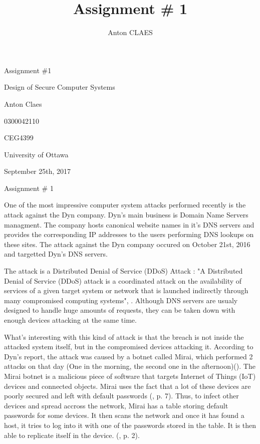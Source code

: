 \documentclass[a4paper,man,natbib,12]{apa6}
\title{Assignment \# 1}
\author{Anton CLAES}
\affiliation{University of Ottawa}
\begin{document}
\thispagestyle{empty}

\begin{center}
\vspace*{5\baselineskip}
Assignment \#1

Design of Secure Computer Systems

\vspace*{10\baselineskip}

Anton Claes

0300042110

CEG4399

University of Ottawa

September 25th, 2017

\newpage

Assignment \# 1
\end{center}

\qquad One of the most impressive computer system attacks performed recently is the attack against the Dyn company. Dyn's main business is Domain Name Servers managment. The company hosts canonical website names in it's DNS servers and provides the corresponding IP addresses to the users performing DNS lookups on these sites. The attack against the Dyn company occured on October 21st, 2016 and targetted Dyn's DNS servers. 

\qquad The attack is a Distributed Denial of Service (DDoS) Attack : "A Distributed Denial of
Service (DDoS) attack is a coordinated attack on the
availability of services of a given target system or network
that is launched indirectly through many compromised
computing systems", \cite{DDoS}. Although DNS servers are usualy designed to handle huge amounts of requests, they can be taken down with enough devices attacking at the same time. 

\qquad What's interesting with this kind of attack is that the breach is not inside the attacked system itself, but in the compromised devices attacking it. According to Dyn's report, the attack was caused by a botnet called Mirai, which performed 2 attacks on that day (One in the morning, the second one in the afternoon)(\cite{Dyn}). The Mirai botnet is a malicious piece of software that targets Internet of Things (IoT) devices and connected objects. Mirai uses the fact that a lot of these devices are poorly secured and left with default passwords (\cite{46301}, p. 7). Thus, to infect other devices and spread accross the network, Mirai has a table storing default passwords for some devices. It then scans the network and once it has found a host, it tries to log into it with one of the passwords stored in the table. It is then able to replicate itself in the device. (\cite{46301}, p. 2). 
\end{document}
